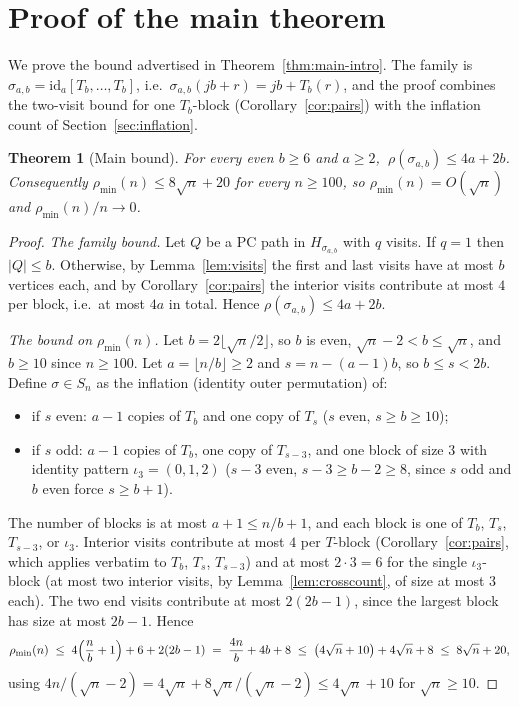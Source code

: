 \documentclass[11pt]{article}
\newtheorem{theorem}{Theorem}[section]
\theoremstyle{definition}
\newcommand{\pmin}{\rho_{\min}}
\begin{document}
\section{Proof of the main theorem}\label{sec:main}

We prove the bound advertised in Theorem~\ref{thm:main-intro}. The family is
$\sigma_{a,b} = \mathrm{id}_a[T_b, \dots, T_b]$, i.e.\ $\sigma_{a,b}(jb+r) = jb + T_b(r)$,
and the proof combines the two-visit bound for one $T_b$-block
(Corollary~\ref{cor:pairs}) with the inflation count of Section~\ref{sec:inflation}.

\begin{theorem}[Main bound]\label{thm:main}
For every even $b \ge 6$ and $a \ge 2$, $\ \rho(\sigma_{a,b}) \le 4a + 2b$. Consequently
$\pmin(n) \le 8\sqrt n + 20$ for every $n \ge 100$, so $\pmin(n) = O(\sqrt n)$ and
$\pmin(n)/n \to 0$.
\end{theorem}

\begin{proof}
\emph{The family bound.} Let $Q$ be a PC path in $H_{\sigma_{a,b}}$ with $q$ visits. If
$q = 1$ then $|Q| \le b$. Otherwise, by Lemma~\ref{lem:visits} the first and last visits
have at most $b$ vertices each, and by Corollary~\ref{cor:pairs} the interior visits
contribute at most $4$ per block, i.e.\ at most $4a$ in total. Hence
$\rho(\sigma_{a,b}) \le 4a + 2b$.

\emph{The bound on $\pmin(n)$.} Let $b = 2\lfloor \sqrt n / 2 \rfloor$, so $b$ is even,
$\sqrt n - 2 < b \le \sqrt n$, and $b \ge 10$ since $n \ge 100$. Let
$a = \lfloor n/b \rfloor \ge 2$ and $s = n - (a-1)b$, so $b \le s < 2b$. Define
$\sigma \in S_n$ as the inflation (identity outer permutation) of:
\begin{itemize}
\item if $s$ even: $a - 1$ copies of $T_b$ and one copy of $T_s$ ($s$ even,
$s \ge b \ge 10$);
\item if $s$ odd: $a - 1$ copies of $T_b$, one copy of $T_{s-3}$, and one block of size
$3$ with identity pattern $\iota_3 = (0,1,2)$ ($s-3$ even, $s-3 \ge b-2 \ge 8$, since
$s$ odd and $b$ even force $s \ge b+1$).
\end{itemize}
The number of blocks is at most $a+1 \le n/b + 1$, and each block is one of $T_b$, $T_s$,
$T_{s-3}$, or $\iota_3$. Interior visits contribute at most $4$ per $T$-block
(Corollary~\ref{cor:pairs}, which applies verbatim to $T_b$, $T_s$, $T_{s-3}$) and at
most $2 \cdot 3 = 6$ for the single $\iota_3$-block (at most two interior visits, by
Lemma~\ref{lem:crosscount}, of size at most $3$ each). The two end visits contribute at
most $2(2b-1)$, since the largest block has size at most $2b-1$. Hence
\[
\pmin(n) \;\le\; 4\Bigl(\frac n b + 1\Bigr) + 6 + 2(2b-1) \;=\; \frac{4n}{b} + 4b + 8
\;\le\; \bigl(4\sqrt n + 10\bigr) + 4\sqrt n + 8 \;\le\; 8\sqrt n + 20,
\]
using $4n/(\sqrt n - 2) = 4\sqrt n + 8\sqrt n/(\sqrt n - 2) \le 4\sqrt n + 10$ for
$\sqrt n \ge 10$.
\end{proof}
\end{document}
